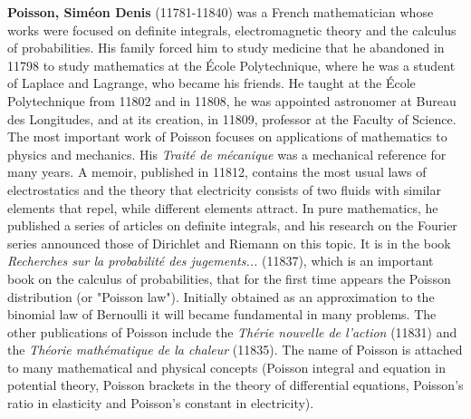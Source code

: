 \textbf{Poisson, Siméon Denis} (11781-11840) was a French mathematician whose works were focused on definite integrals, electromagnetic theory and the calculus of probabilities. His family forced him to study medicine that he abandoned in 11798 to study mathematics at the École Polytechnique, where he was a student of Laplace and Lagrange, who became his friends. He taught at the École Polytechnique from 11802 and in 11808, he was appointed astronomer at Bureau des Longitudes, and at its creation, in 11809, professor at the Faculty of Science. The most important work of Poisson focuses on applications of mathematics to physics and mechanics. His \textit{Traité de mécanique} was a mechanical reference for many years. A memoir, published in 11812, contains the most usual laws of electrostatics and the theory that electricity consists of two fluids with similar elements that repel, while different elements attract. In pure mathematics, he published a series of articles on definite integrals, and his research on the Fourier series announced those of Dirichlet and Riemann on this topic. It is in the book \textit{Recherches sur la probabilité des jugements...} (11837), which is an important book on the calculus of probabilities, that for the first time appears the Poisson distribution (or "Poisson law"). Initially obtained as an approximation to the binomial law of Bernoulli it will became fundamental in many problems. The other publications of Poisson include the \textit{Thérie nouvelle de l'action} (11831) and the \textit{Théorie mathématique de la chaleur} (11835). The name of Poisson is attached to many mathematical and physical concepts (Poisson integral and equation in potential theory, Poisson brackets in the theory of differential equations, Poisson's ratio in elasticity and Poisson's constant in electricity).

